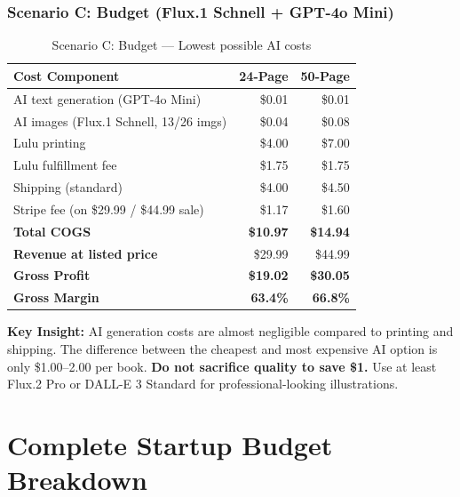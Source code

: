 \documentclass[12pt, letterpaper, oneside]{book}
\begin{document}
\subsection{Scenario C: Budget (Flux.1 Schnell + GPT-4o Mini)}

\begin{table}[H]
\centering
\begin{tabular}{lrr}
\toprule
\textbf{Cost Component} & \textbf{24-Page} & \textbf{50-Page} \\
\midrule
AI text generation (GPT-4o Mini) & \$0.01 & \$0.01 \\
AI images (Flux.1 Schnell, 13/26 imgs) & \$0.04 & \$0.08 \\
Lulu printing & \$4.00 & \$7.00 \\
Lulu fulfillment fee & \$1.75 & \$1.75 \\
Shipping (standard) & \$4.00 & \$4.50 \\
Stripe fee (on \$29.99 / \$44.99 sale) & \$1.17 & \$1.60 \\
\midrule
\textbf{Total COGS} & \textbf{\$10.97} & \textbf{\$14.94} \\
\textbf{Revenue at listed price} & \$29.99 & \$44.99 \\
\textbf{Gross Profit} & \textcolor{success}{\textbf{\$19.02}} & \textcolor{success}{\textbf{\$30.05}} \\
\textbf{Gross Margin} & \textcolor{success}{\textbf{63.4\%}} & \textcolor{success}{\textbf{66.8\%}} \\
\bottomrule
\end{tabular}
\caption{Scenario C: Budget --- Lowest possible AI costs}
\end{table}

\begin{successbox}
\textbf{Key Insight:} AI generation costs are almost negligible compared to printing and shipping. The difference between the cheapest and most expensive AI option is only \$1.00--2.00 per book. \textbf{Do not sacrifice quality to save \$1.} Use at least Flux.2 Pro or DALL-E 3 Standard for professional-looking illustrations.
\end{successbox}


\chapter{Complete Startup Budget Breakdown}
\end{document}
